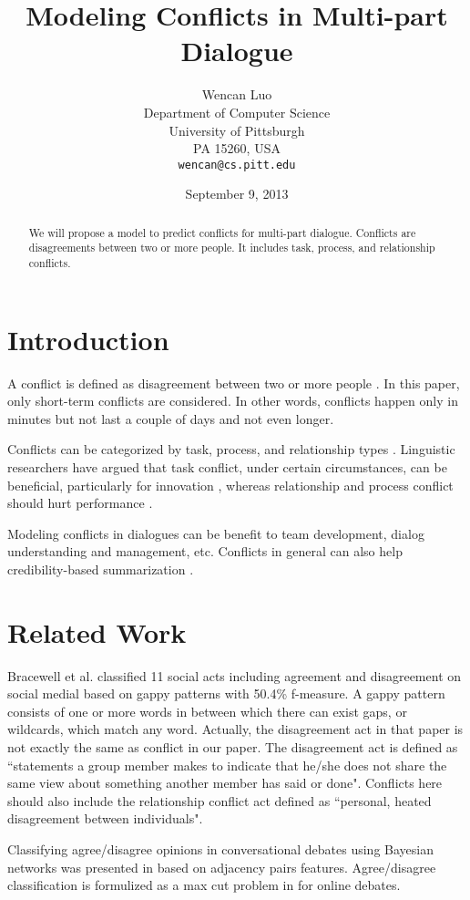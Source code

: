 \documentclass[11pt,letterpaper]{article}
\title{Modeling Conflicts in Multi-part Dialogue}
\author{Wencan Luo\\
	    Department of Computer Science\\
	    University of Pittsburgh\\
	    PA 15260, USA\\
	    {\tt wencan@cs.pitt.edu}
	  }
\date{September 9, 2013}
\begin{document}
\maketitle
\begin{abstract}
We will propose a model to predict conflicts for multi-part dialogue. Conflicts are disagreements between two or more people. It includes task, process, and relationship conflicts.

\end{abstract}

\section{Introduction}
A conflict is defined as disagreement between two or more people \cite{Paletz:2011}. In this paper, only short-term conflicts are considered. In other words, conflicts happen only in minutes but not last a couple of days and not even longer.

Conflicts can be categorized by task, process, and relationship types \cite{Jehn:1995,Jehn:1997}. Linguistic researchers have argued that task conflict, under certain circumstances, can be beneficial, particularly for innovation \cite{Jehn:1997,West:2002}, whereas relationship and process conflict should hurt performance \cite{Jehn:1997}.

Modeling conflicts in dialogues can be benefit to team development, dialog understanding and management, etc. Conflicts in general can also help credibility-based summarization \cite{Kaneko:2009}.

\section{Related Work}
Bracewell et al.  classified 11 social acts including agreement and disagreement on social medial based on gappy patterns with 50.4\% f-measure. A gappy pattern consists of one or more words in between which there can exist gaps, or wildcards, which match any word. Actually, the disagreement act in that paper is not exactly the same as conflict in our paper. The disagreement act is defined as ``statements a group member makes to indicate that he/she does not share the same
view about something another member has said or done". Conflicts here should also include the relationship conflict act defined as ``personal, heated disagreement between individuals".

Classifying agree/disagree opinions in conversational debates using Bayesian networks was presented in \cite{Galley:2004} based on adjacency pairs features. 
Agree/disagree classification is formulized as a max cut problem in \cite{Murakami:2010} for online debates.
\end{document}
